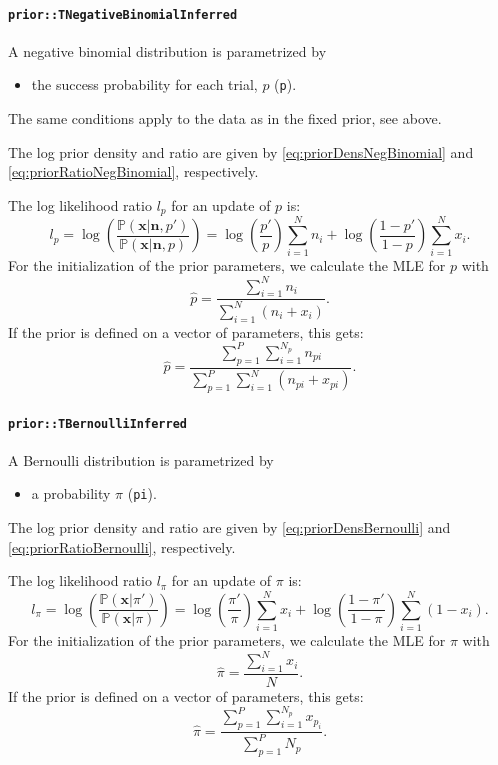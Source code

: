 \documentclass[a4paper,11pt]{article}
\def\p{\mathbb{P}}
\newcommand{\class}[1]{\texttt{#1}}
\newcommand{\privparam}[1]{\texttt{\textunderscore #1}}
\begin{document}
\paragraph{\class{prior::TNegativeBinomialInferred}}
A negative binomial distribution is parametrized by
\begin{itemize}
 \item the success probability for each trial, $p$ (\privparam{p}).
\end{itemize}
The same conditions apply to the data as in the fixed prior, see above.

The log prior density and ratio are given by \eqref{eq:priorDensNegBinomial} and \eqref{eq:priorRatioNegBinomial}, respectively.

The log likelihood ratio $l_p$ for an update of $p$ is:
\begin{equation*}
 l_p = \log \left(\frac{\p(\boldsymbol x | \boldsymbol n, p')}{\p(\boldsymbol x | \boldsymbol n, p)} \right) = \log\left(\frac{p'}{p} \right) \sum_{i=1}^N n_i + \log\left(\frac{1-p'}{1-p} \right) \sum_{i=1}^N x_i.
\end{equation*}
For the initialization of the prior parameters, we calculate the MLE for $p$ with
\begin{equation*}
 \hat{p} = \frac{\sum_{i=1}^N n_i}{\sum_{i=1}^N( n_i + x_i)}.
\end{equation*}
If the prior is defined on a vector of parameters, this gets:
\begin{equation*}
 \hat{p} = \frac{\sum_{p=1}^P \sum_{i=1}^{N_p} n_{pi}}{\sum_{p=1}^P \sum_{i=1}^N (n_{pi} + x_{pi})}.
\end{equation*}

\paragraph{\class{prior::TBernoulliInferred}}
A Bernoulli distribution is parametrized by
\begin{itemize}
 \item a probability $\pi$ (\privparam{pi}).
\end{itemize}
The log prior density and ratio are given by \eqref{eq:priorDensBernoulli} and \eqref{eq:priorRatioBernoulli}, respectively.

The log likelihood ratio $l_\pi$ for an update of $\pi$ is:
\begin{equation*}
 l_\pi = \log \left(\frac{\p(\boldsymbol x | \pi')}{\p(\boldsymbol x | \pi)} \right) = \log\left(\frac{\pi'}{\pi} \right) \sum_{i=1}^N x_i + \log\left(\frac{1-\pi'}{1-\pi} \right) \sum_{i=1}^N (1-x_i).
\end{equation*}
For the initialization of the prior parameters, we calculate the MLE for $\pi$ with
\begin{equation*}
 \hat{\pi} = \frac{\sum_{i=1}^N x_i}{N}.
\end{equation*}
If the prior is defined on a vector of parameters, this gets:
\begin{equation*}
 \hat{\pi} = \frac{\sum_{p=1}^P \sum_{i=1}^{N_p} x_{p_i}}{\sum_{p=1}^P N_p}.
\end{equation*}
\end{document}
